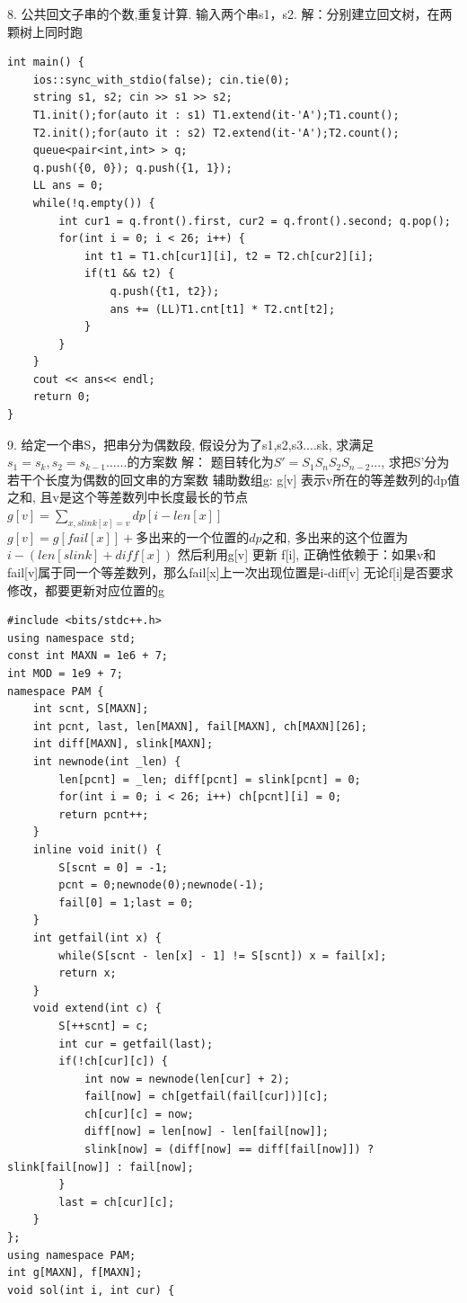 \documentclass[10pt]{ctexart}
\begin{document}
{8. 公共回文子串的个数,重复计算. 输入两个串s1，s2. 解：分别建立回文树，在两颗树上同时跑
\begin{lstlisting}
int main() {
    ios::sync_with_stdio(false); cin.tie(0);
    string s1, s2; cin >> s1 >> s2;
    T1.init();for(auto it : s1) T1.extend(it-'A');T1.count();
    T2.init();for(auto it : s2) T2.extend(it-'A');T2.count();
    queue<pair<int,int> > q;
    q.push({0, 0}); q.push({1, 1});
    LL ans = 0;
    while(!q.empty()) {
        int cur1 = q.front().first, cur2 = q.front().second; q.pop();
        for(int i = 0; i < 26; i++) {
            int t1 = T1.ch[cur1][i], t2 = T2.ch[cur2][i]; 
            if(t1 && t2) {
                q.push({t1, t2});
                ans += (LL)T1.cnt[t1] * T2.cnt[t2];
            }
        }
    }
    cout << ans<< endl;
    return 0;
} 
\end{lstlisting}
9. 给定一个串S，把串分为偶数段, 假设分为了s1,s2,s3....sk, 求满足$s_1=s_k,s_2=s_{k-1}......$的方案数
解： 题目转化为$S'= S_1S_nS_2S_{n−2}...$, 求把S'分为若干个长度为偶数的回文串的方案数
辅助数组g: g[v] 表示v所在的等差数列的dp值之和, 且v是这个等差数列中长度最长的节点
$g[v] = \sum_{x, slink[x]=v} dp[i - len[x]]$
$g[v] = g[fail[x]] + 多出来的一个位置的dp 之和$, 多出来的这个位置为$i - (len[slink] + diff[x])$
然后利用g[v] 更新 f[i], 正确性依赖于：如果v和fail[v]属于同一个等差数列，那么fail[x]上一次出现位置是i-diff[v]
无论f[i]是否要求修改，都要更新对应位置的g
\begin{lstlisting}
#include <bits/stdc++.h>
using namespace std;
const int MAXN = 1e6 + 7;
int MOD = 1e9 + 7;
namespace PAM {
    int scnt, S[MAXN];
    int pcnt, last, len[MAXN], fail[MAXN], ch[MAXN][26];
    int diff[MAXN], slink[MAXN];
    int newnode(int _len) {
        len[pcnt] = _len; diff[pcnt] = slink[pcnt] = 0;
        for(int i = 0; i < 26; i++) ch[pcnt][i] = 0;
        return pcnt++;
    }
    inline void init() {
        S[scnt = 0] = -1;
        pcnt = 0;newnode(0);newnode(-1);
        fail[0] = 1;last = 0;
    }
    int getfail(int x) {
        while(S[scnt - len[x] - 1] != S[scnt]) x = fail[x];
        return x;
    }
    void extend(int c) {
        S[++scnt] = c;
        int cur = getfail(last);
        if(!ch[cur][c]) {
            int now = newnode(len[cur] + 2);
            fail[now] = ch[getfail(fail[cur])][c];
            ch[cur][c] = now;
            diff[now] = len[now] - len[fail[now]];
            slink[now] = (diff[now] == diff[fail[now]]) ? slink[fail[now]] : fail[now];
        }
        last = ch[cur][c];
    }
};
using namespace PAM;
int g[MAXN], f[MAXN];
void sol(int i, int cur) {

\end{lstlisting}}
\end{document}
